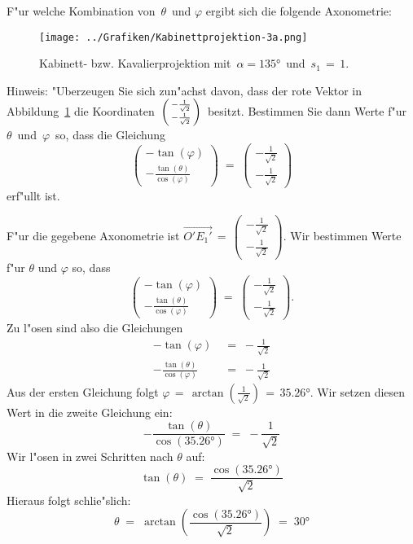 \begin{Aufgabe}
\begin{Teilaufgaben}
\item F"ur welche Kombination von\, $\theta$\, und  $\varphi$ ergibt sich die folgende Axonometrie:
 \begin{figure}[ht]
  \centering
  \texttt{[image: ../Grafiken/Kabinettprojektion-3a.png]}
  \caption{Kabinett- bzw. Kavalierprojektion mit\, $\alpha = \ang{135}$\, und \,$s_1\, =\,1$.}
  \label{Kabinettproj}
  \end{figure}

  Hinweis: "Uberzeugen Sie sich zun"achst davon, dass der rote Vektor in Abbildung~\ref{Kabinettproj} die Koordinaten\, $\begin{psmallmatrix} - \frac{1}{\sqrt{2}}\\ - \frac{1}{\sqrt{2}} \end{psmallmatrix}$\, besitzt. Bestimmen Sie dann Werte f"ur\, $\theta$\, und\, $\varphi$\, so, dass die Gleichung \[\begin{pmatrix} - \tan(\varphi) \\ - \frac{\tan(\theta)}{\cos(\varphi)} \end{pmatrix}\;=\;\begin{pmatrix} - \frac{1}{\sqrt{2}}\\ - \frac{1}{\sqrt{2}} \end{pmatrix}\] erf"ullt ist.
\end{Teilaufgaben}
\end{Aufgabe}
\begin{Loesung}
\usetikzlibrary{calc}

	F"ur die gegebene Axonometrie ist $\overrightarrow{O'E_1'}\,=\,\begin{pmatrix}- \frac{1}{\sqrt{2}}\\- \frac{1}{\sqrt{2}}\end{pmatrix}$. Wir bestimmen Werte f"ur $\theta$ und $\varphi$ so, dass
	\[\begin{pmatrix}- \tan (\varphi)\\
	- \frac{\tan (\theta)}{\cos (\varphi)}\end{pmatrix}\;=\;\begin{pmatrix}- \frac{1}{\sqrt{2}}\\- \frac{1}{\sqrt{2}}\end{pmatrix}. 
	\] Zu l"osen sind also die Gleichungen \begin{align*}- \tan (\varphi)\;&=\;- \frac{1}{\sqrt{2}}\\ 
	- \frac{\tan (\theta)}{\cos (\varphi)}\;&=\;- \frac{1}{\sqrt{2}}
	\end{align*} Aus der ersten Gleichung folgt $\varphi\,=\,\arctan\left(\frac{1}{\sqrt{2}}\right)\,=\,\ang{35.26}$. Wir setzen diesen Wert in die zweite Gleichung ein: 
	\[- \frac{\tan (\theta)}{\cos \left(\ang{35.26}\right)}\;=\;- \frac{1}{\sqrt{2}}\] Wir l"osen in zwei Schritten nach $\theta$ auf: 
	\[\tan (\theta)\;=\;\frac{\cos \left(\ang{35.26}\right)}{\sqrt{2}}\] Hieraus folgt schlie"slich:
	\[\theta\;=\;\arctan\left(\frac{\cos \left(\ang{35.26}\right)}{\sqrt{2}}\right)\;=\;\ang{30}
	\]
\end{Loesung}